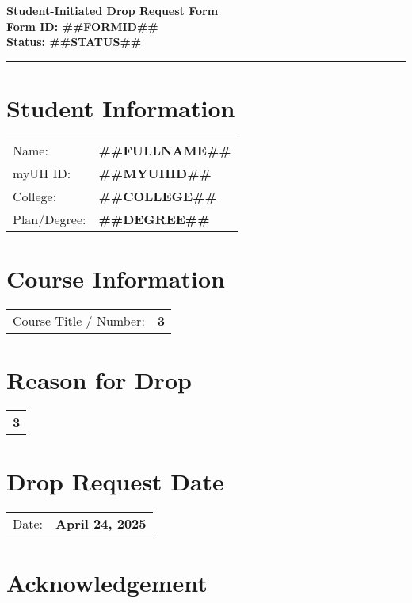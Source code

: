 \documentclass[12pt]{article}
\begin{document}
\begin{center}
  \textbf{\Large Student-Initiated Drop Request Form}\\[0.2cm]
  \textbf{Form ID: ##FORMID##}\\[0.2cm]
  \textbf{Status: ##STATUS##}
\end{center}

\hrule
\vspace{0.5cm}

\section*{Student Information}
\begin{tabular}{ll}
Name: & \textbf{##FULLNAME##} \\
myUH ID: & \textbf{##MYUHID##} \\
College: & \textbf{##COLLEGE##} \\
Plan/Degree: & \textbf{##DEGREE##} \\
\end{tabular}

\vspace{0.5cm}

\section*{Course Information}
\begin{tabular}{ll}
Course Title / Number: & \textbf{3} \\
\end{tabular}

\section*{Reason for Drop}
\begin{tabular}{p{12cm}}
\textbf{3}
\end{tabular}

\section*{Drop Request Date}
\begin{tabular}{ll}
Date: & \textbf{April 24, 2025} \\
\end{tabular}

\section*{Acknowledgement}
\noindent{}
\end{document}
